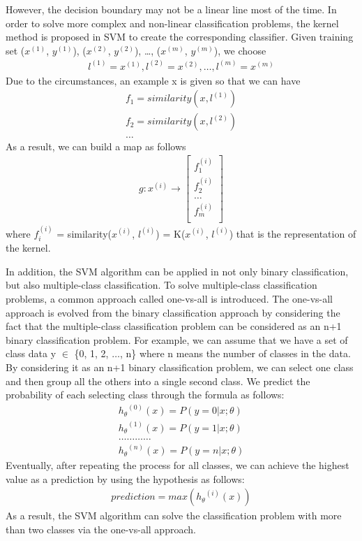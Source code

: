 However, the decision boundary may not be a linear line most of the time. In order to solve more complex and non-linear classification problems, the kernel method is proposed in SVM to create the corresponding classifier. Given training set ($x^{(1)}$, $y^{(1)}$), ($x^{(2)}$, $y^{(2)}$), \ldots, ($x^{(m)}$, $y^{(m)}$), we choose 
\begin{align*}
    l^{(1)} = x^{(1)}, l^{(2)} = x^{(2)}, \ldots, l^{(m)} = x^{(m)}
\end{align*}
Due to the circumstances, an example x is given so that we can have
\begin{align*}
    f_1 = similarity(x, l^{(1)})\\
    f_2 = similarity(x, l^{(2)})\\
    \dots 
\end{align*}
As a result, we can build a map as follows
\begin{align*}
    g: x^{(i)} \rightarrow 
    \begin{bmatrix}
        f_1^{(i)} \\
        f_2^{(i)} \\
        \dots \\
        f_m^{(i)} \\
    \end{bmatrix}
\end{align*}
where $f_i^{(i)}$ = similarity($x^{(i)}$, $l^{(i)}$) = K($x^{(i)}$, $l^{(i)}$) that is the representation of the kernel.\par
In addition, the SVM algorithm can be applied in not only binary classification, but also multiple-class classification. To solve multiple-class classification problems, a common approach called one-vs-all is introduced. The one-vs-all approach is evolved from the binary classification approach by considering the fact that the multiple-class classification problem can be considered as an n+1 binary classification problem. For example, we can assume that we have a set of class data y $\in$ \{0, 1, 2, $\ldots$, n\} where n means the number of classes in the data. By considering it as an n+1 binary classification problem, we can select one class and then group all the others into a single second class. We predict the probability of each selecting class through the formula as follows:
\begin{align*}
    {h_\theta}^{(0)}(x) = P (y = 0 | x ;\theta)\\
    {h_\theta}^{(1)}(x) = P (y = 1 | x ;\theta)\\
    \ldots \ldots \ldots \ldots\\
    {h_\theta}^{(n)}(x) = P (y = n | x ;\theta)
\end{align*}
Eventually, after repeating the process for all classes, we can achieve the highest value as a prediction by using the hypothesis as follows:
\begin{align*}
    prediction = max ({h_\theta}^{(i)}(x))
\end{align*}
As a result, the SVM algorithm can solve the classification problem with more than two classes via the one-vs-all approach.

